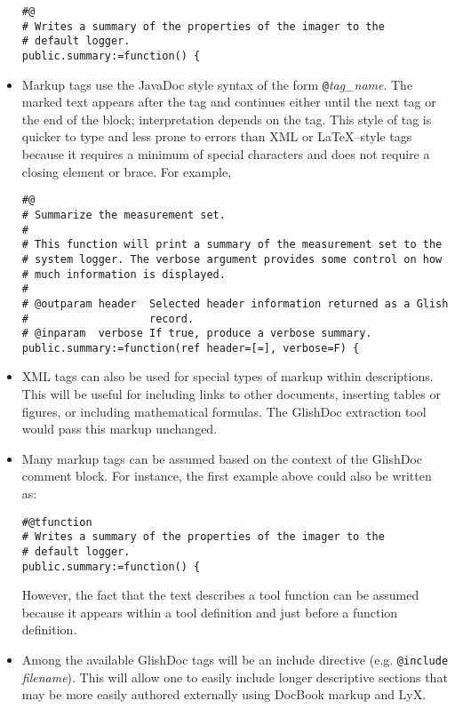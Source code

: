 \begin{itemize}
\goodbreak

\begin{verbatim}
#@
# Writes a summary of the properties of the imager to the
# default logger.
public.summary:=function() {
\end{verbatim}

\item Markup tags use the JavaDoc style syntax of the form
\verb|@|{\it tag\_name}.  The marked text appears after the tag and
continues either until the next tag or the end of the block;
interpretation depends on the tag.  This style of tag is quicker to
type and less prone to errors than XML or \LaTeX--style tags because
it requires a minimum of special characters and does not require a
closing element or brace.  For example,

\begin{verbatim}
#@
# Summarize the measurement set.
#
# This function will print a summary of the measurement set to the
# system logger. The verbose argument provides some control on how
# much information is displayed.
# 
# @outparam header  Selected header information returned as a Glish 
#                   record.
# @inparam  verbose If true, produce a verbose summary.
public.summary:=function(ref header=[=], verbose=F) {
\end{verbatim}

\item XML tags can also be used for special types of markup within
descriptions.  This will be useful for including links to other
documents, inserting tables or figures, or including mathematical
formulas.  The GlishDoc extraction tool would pass this markup
unchanged. 

\item Many markup tags can be assumed based on the context of the
GlishDoc comment block.  For instance, the first example above could
also be written as: 

\begin{verbatim}
#@tfunction
# Writes a summary of the properties of the imager to the
# default logger.
public.summary:=function() {
\end{verbatim}

However, the fact that the text describes a tool function can be
assumed because it appears within a tool definition and just before a
function definition.  

\item Among the available GlishDoc tags will be an include directive
(e.g. \verb|@include| {\it filename}).  This will allow one to easily
include longer descriptive sections that may be more easily authored
externally using DocBook markup and LyX.


\end{itemize}
